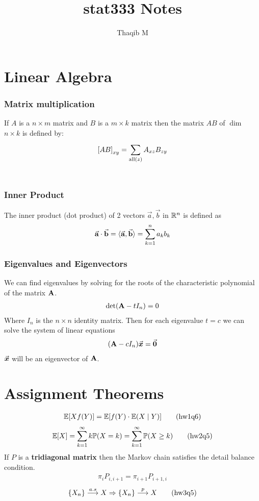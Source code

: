 \documentclass[12pt,a4paper]{article}
\author{Thaqib M}
\title{stat333 Notes}
\begin{document}
\maketitle
\newpage
\section*{Linear Algebra}
\subsubsection*{Matrix multiplication} If $A$ is a $n\times m$ matrix and $B$ is a $m\times k$ matrix then the matrix $AB$ of $\dim$ $n\times k$ is defined by: 
\begin{align*}
{\bf[}AB{\bf]}_{xy} = \sum\limits_{\mathrm{all}(z)}^{}A_{xz}B_{zy}
\end{align*}
\\
\subsubsection*{Inner Product} The inner product (dot product) of 2 vectors $\vec{a}, \vec{b}$ in $\mathbb{R}^n$ is defined as
\begin{align*}
\va{a}\cdot \va{b} = \langle\va{a},\va{b}\rangle = \sum\limits_{k=1}^{n}a_kb_k
\end{align*}
\subsubsection*{Eigenvalues and Eigenvectors}
We can find eigenvalues by solving for the roots of the characteristic polynomial of the matrix $\vb A$.
\begin{align*}
\det(\vb A-tI_n) = 0
\end{align*}
Where $I_n$ is the $n\times n$ identity matrix.
Then for each eigenvalue $t=c$ we can solve the system of linear equations 
\begin{align*}
(\vb A - cI_n)\va* x = \va* 0
\end{align*}
$\va* x$ will be an eigenvector of $\vb A$. 
\newpage
\section*{Assignment Theorems}
\begin{align*}
\mathbb{E}[Xf(Y)] = \mathbb{E}[f(Y)\cdot\mathbb{E}(X\;\vert\; Y)] \tag{hw1q6}
\end{align*}
\begin{align*}
\mathbb{E}[X] = \sum\limits_{k=1}^{\infty}k\mathbb{P}(X=k) = \sum\limits_{k=1}^{\infty} \mathbb{P}(X\geq k) \tag{hw2q5}
\end{align*}
If $P$ is a \textbf{tridiagonal matrix} then the Markov chain satisfies the detail balance condition. 
\begin{align*}
\pi_i P_{i, i+1} = \pi_{i+1}P_{i+1, i} \tag{hw2q7}
\end{align*}
\begin{align*}
\{X_n\} \overset{a.s}{\longrightarrow} X \Rightarrow \{X_n\}\overset{p}{\longrightarrow} X \tag{hw3q5}
\end{align*}
\newpage
\end{document}
